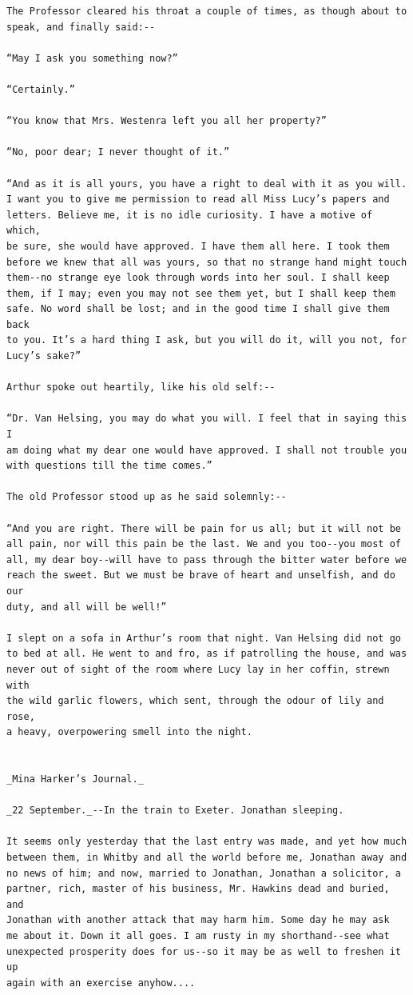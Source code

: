 \documentclass{article}
\begin{document}
\begin{verbatim}
The Professor cleared his throat a couple of times, as though about to
speak, and finally said:--

“May I ask you something now?”

“Certainly.”

“You know that Mrs. Westenra left you all her property?”

“No, poor dear; I never thought of it.”

“And as it is all yours, you have a right to deal with it as you will.
I want you to give me permission to read all Miss Lucy’s papers and
letters. Believe me, it is no idle curiosity. I have a motive of which,
be sure, she would have approved. I have them all here. I took them
before we knew that all was yours, so that no strange hand might touch
them--no strange eye look through words into her soul. I shall keep
them, if I may; even you may not see them yet, but I shall keep them
safe. No word shall be lost; and in the good time I shall give them back
to you. It’s a hard thing I ask, but you will do it, will you not, for
Lucy’s sake?”

Arthur spoke out heartily, like his old self:--

“Dr. Van Helsing, you may do what you will. I feel that in saying this I
am doing what my dear one would have approved. I shall not trouble you
with questions till the time comes.”

The old Professor stood up as he said solemnly:--

“And you are right. There will be pain for us all; but it will not be
all pain, nor will this pain be the last. We and you too--you most of
all, my dear boy--will have to pass through the bitter water before we
reach the sweet. But we must be brave of heart and unselfish, and do our
duty, and all will be well!”

I slept on a sofa in Arthur’s room that night. Van Helsing did not go
to bed at all. He went to and fro, as if patrolling the house, and was
never out of sight of the room where Lucy lay in her coffin, strewn with
the wild garlic flowers, which sent, through the odour of lily and rose,
a heavy, overpowering smell into the night.


_Mina Harker’s Journal._

_22 September._--In the train to Exeter. Jonathan sleeping.

It seems only yesterday that the last entry was made, and yet how much
between them, in Whitby and all the world before me, Jonathan away and
no news of him; and now, married to Jonathan, Jonathan a solicitor, a
partner, rich, master of his business, Mr. Hawkins dead and buried, and
Jonathan with another attack that may harm him. Some day he may ask
me about it. Down it all goes. I am rusty in my shorthand--see what
unexpected prosperity does for us--so it may be as well to freshen it up
again with an exercise anyhow....


\end{verbatim}
\end{document}
